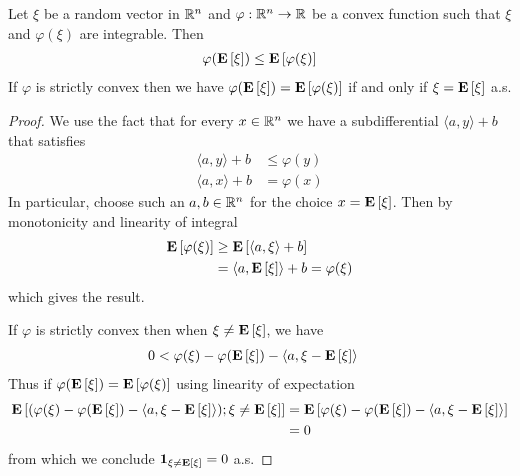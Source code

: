 \begin{thm}\label{Jensen}Let $\xi$ be a random vector in $\mathbb{R}^n$
  and $\varphi : \mathbb{R}^n \to \mathbb{R}$ be a convex function such that
  $\xi$ and $\varphi(\xi)$ are integrable.  Then 
\begin{align*}
\varphi(\textbf{E}\left[\xi\right]) \leq \textbf{E}\left[\varphi(\xi)\right]
\end{align*}
If $\varphi$ is strictly convex then we have $\varphi(\textbf{E}\left[\xi\right]) = \textbf{E}\left[\varphi(\xi)\right]$ if and only if $\xi =
\textbf{E}\left[\xi\right]$ a.s.
\end{thm}
\begin{proof}We use the fact that for every $x \in \mathbb{R}^n$ we have a
  subdifferential $\langle a, y \rangle + b$ that satisfies
\begin{align*}
\langle a, y \rangle + b &\leq \varphi(y) \\
\langle a,x \rangle + b &= \varphi(x)
\end{align*}
In particular, choose such an $a,b \in \mathbb{R}^n$ for the choice $x =
\textbf{E}\left[\xi\right]$.  Then by monotonicity and linearity of integral
\begin{align*}
\textbf{E}\left[\varphi(\xi)\right] &\geq \textbf{E}\left[\langle a, \xi\rangle +
  b\right] \\
&= \langle a, \textbf{E}\left[\xi\right] \rangle + b = \varphi(\xi)
\end{align*}
which gives the result.

If $\varphi$ is strictly convex then when $\xi \neq \textbf{E}\left[\xi\right]$,
we have 
\begin{align*}
0 &< \varphi(\xi) - \varphi(\textbf{E}\left[\xi\right]) - \langle a , \xi -
\textbf{E}\left[\xi\right] \rangle
\end{align*}  Thus if $\varphi(\textbf{E}\left[\xi\right]) =
\textbf{E}\left[\varphi(\xi)\right]$ using linearity of expectation
\begin{align*}
\textbf{E}\left[ (\varphi(\xi) - \varphi(\textbf{E}\left[\xi\right]) - \langle a , \xi -
\textbf{E}\left[\xi\right]\rangle); \xi \neq \textbf{E}\left[\xi\right]\right] &= \textbf{E}\left[\varphi(\xi) - \varphi(\textbf{E}\left[\xi\right]) - \langle a , \xi -
\textbf{E}\left[\xi\right]\rangle\right] \\
&=0
\end{align*}
from which we conclude $\textbf{1}_{\xi \neq \textbf{E}\left[\xi\right]} = 0$ a.s.
\end{proof}

